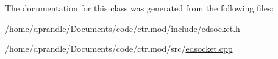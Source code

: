 The documentation for this class was generated from the following files\-:\begin{DoxyCompactItemize}
\item 
/home/dprandle/\-Documents/code/ctrlmod/include/\hyperlink{edsocket_8h}{edsocket.\-h}\item 
/home/dprandle/\-Documents/code/ctrlmod/src/\hyperlink{edsocket_8cpp}{edsocket.\-cpp}\end{DoxyCompactItemize}
